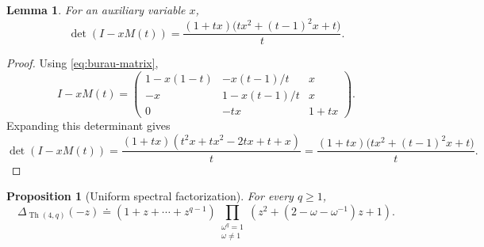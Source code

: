 \documentclass[11pt]{amsart}
\newtheorem{proposition}[theorem]{Proposition}
\newtheorem{lemma}[theorem]{Lemma}
\newcommand{\Th}{\operatorname{Th}}
\newcommand{\dd}{\doteq}
\begin{document}
\begin{lemma}\label{lem:det-I-xM}
For an auxiliary variable \(x\),
\begin{equation}\label{eq:det-I-xM}
        \det(I-xM(t))
        =\frac{(1+tx)\bigl(tx^2+(t-1)^2x+t\bigr)}{t}.
\end{equation}
\end{lemma}

\begin{proof}
Using \eqref{eq:burau-matrix},
\[
I-xM(t)=
\begin{pmatrix}
1-x(1-t)&-x(t-1)/t&x\\
-x&1-x(t-1)/t&x\\
0&-tx&1+tx
\end{pmatrix}.
\]
Expanding this determinant gives
\[
        \det(I-xM(t))
        =\frac{(1+tx)(t^2x+tx^2-2tx+t+x)}{t}
        =\frac{(1+tx)\bigl(tx^2+(t-1)^2x+t\bigr)}{t}.
\]
\end{proof}

\begin{proposition}[Uniform spectral factorization]\label{prop:uniform-factorization}
For every \(q\ge1\),
\begin{equation}\label{eq:uniform-factorization}
        \Delta_{\Th(4,q)}(-z)
        \dd
        (1+z+\cdots+z^{q-1})
        \prod_{\substack{\omega^q=1\\ \omega\ne1}}
        \left(z^2+(2-\omega-\omega^{-1})z+1\right).
\end{equation}
\end{proposition}
\end{document}
